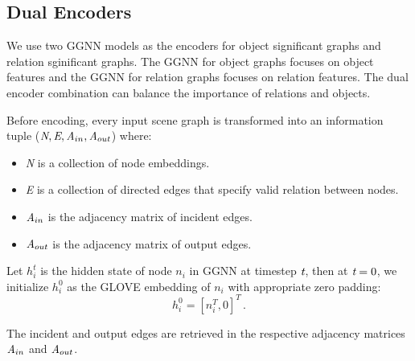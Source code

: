 \documentclass[letterpaper]{article} %
\begin{document}
\subsection{Dual Encoders}
We use two GGNN models as the encoders for object significant graphs and relation sginificant graphs. The GGNN for object graphs focuses on object features and the GGNN for relation graphs focuses on relation features. The dual encoder combination can balance the importance of relations and objects.

Before encoding, every input scene graph is transformed into an information tuple ($\emph{N}, \emph{E}, \emph{A}_{in}, \emph{A}_{out}$) where:
\begin{itemize}
    \item \emph{N} is a collection of node embeddings.
    \item \emph{E} is a collection of directed edges that specify valid relation between nodes.
    \item $\emph{A}_{in}$ is the adjacency matrix of incident edges.
    \item $\emph{A}_{out}$ is the adjacency matrix of output edges.
\end{itemize}

Let $h_i^t$ is the hidden state of node $n_i$ in GGNN at timestep $\emph{t}$, then at $\emph{t}=0$, we initialize $h_i^0$ as the GLOVE embedding of $n_i$ with appropriate zero padding:
\begin{equation}
    h_i^0 = [n_i^T, 0]^T  \, .
\end{equation}

The incident and output edges are retrieved in the respective adjacency matrices $\emph{A}_{in}$ and $\emph{A}_{out}$. 

\medskip
\end{document}
